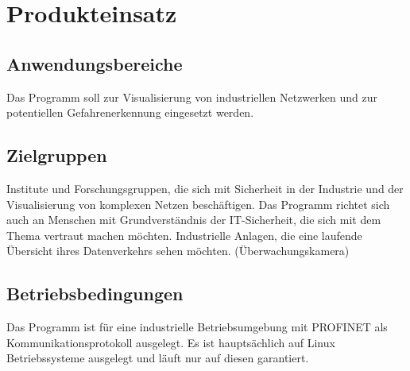 \chapter{Produkteinsatz}

\section{Anwendungsbereiche}
Das Programm soll zur Visualisierung von industriellen Netzwerken und zur potentiellen Gefahrenerkennung eingesetzt werden.

\section{Zielgruppen}
Institute und Forschungsgruppen, die sich mit Sicherheit in der Industrie und der Visualisierung von komplexen Netzen beschäftigen. Das Programm richtet sich auch an Menschen mit Grundverständnis der IT-Sicherheit, die sich mit dem Thema vertraut machen möchten.\newline\newline
Industrielle Anlagen, die eine laufende Übersicht ihres Datenverkehrs sehen möchten. (Überwachungskamera)

\section{Betriebsbedingungen}
Das Programm ist für eine industrielle Betriebsumgebung mit PROFINET als Kommunikationsprotokoll ausgelegt. Es ist hauptsächlich auf Linux Betriebssysteme ausgelegt und läuft nur auf diesen garantiert. 